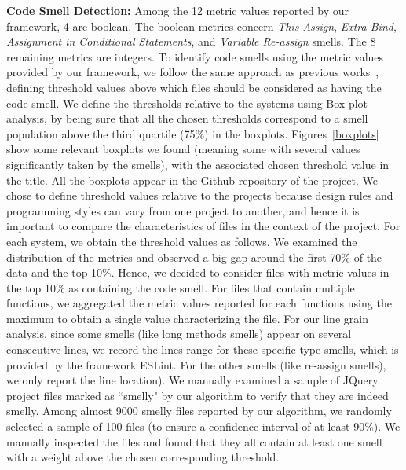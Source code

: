 \documentclass[smallcondensed]{svjour3}
\newcommand{\mytitle}[1]{\textbf{#1:}}
\begin{document}
\mytitle{Code Smell Detection} Among the 12 metric values reported by our framework, 4 are boolean. The boolean metrics concern \emph{This Assign}, \emph{Extra Bind}, \emph{Assignment in Conditional Statements}, and \emph{Variable Re-assign} smells. The 8 remaining metrics are integers. To identify code smells using the metric values provided by our framework, we follow the same approach as previous works~\cite{saboury2017empirical,marinescu2004detection, mazinanian2016migrating}, defining threshold values above which files should be considered as having the code smell. We define the thresholds relative to the systems using Box-plot analysis{\color{blue}, by being sure that all the chosen thresholds correspond to a smell population above the third quartile (75\%) in the boxplots. Figures~\ref{boxplots} show some relevant boxplots we found (meaning some with several values significantly taken by the smells), with the associated chosen threshold value in the title. All the boxplots appear in the Github repository of the project}. We chose to define threshold values relative to the projects because design rules and programming styles can vary from one project to another, and hence it is important to compare the characteristics of files in the context of the project. For each system, we obtain the threshold values as follows. We examined the distribution of the metrics and observed a big gap around the first 70\% of the data and the top 10\%. Hence, we decided to consider files with metric values in the top 10\% as containing the code smell. For files that contain multiple functions, we aggregated the metric values reported for each functions using the maximum to obtain a single value characterizing the file. {\color{blue}For our line grain analysis, since some smells (like long methods smells) appear on several consecutive lines, we record the lines range for these specific type smells, which is provided by the framework ESLint. For the other smells (like re-assign smells), we only report the line location). We manually examined a sample of JQuery project files marked as ``smelly" by our algorithm to verify that they are indeed smelly. Among almost 9000 smelly files reported by our algorithm, we randomly selected a sample of 100 files (to ensure a confidence interval of at least 90\%). We manually inspected the files and found that they all %
contain at least one smell with a weight above the chosen corresponding threshold.} %
\end{document}
